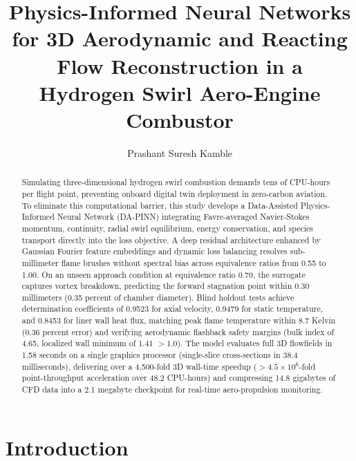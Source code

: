 \documentclass[reprint,aps,prfluids,superscriptaddress,twocolumn,floatfix]{revtex4-2}
\begin{document}
\title{Physics-Informed Neural Networks for 3D Aerodynamic and Reacting Flow Reconstruction in a Hydrogen Swirl Aero-Engine Combustor}

\author{Prashant Suresh Kamble}

\begin{abstract}
Simulating three-dimensional hydrogen swirl combustion demands tens of CPU-hours per flight point, preventing onboard digital twin deployment in zero-carbon aviation. To eliminate this computational barrier, this study develops a Data-Assisted Physics-Informed Neural Network (DA-PINN) integrating Favre-averaged Navier-Stokes momentum, continuity, radial swirl equilibrium, energy conservation, and species transport directly into the loss objective. A deep residual architecture enhanced by Gaussian Fourier feature embeddings and dynamic loss balancing resolves sub-millimeter flame brushes without spectral bias across equivalence ratios from 0.55 to 1.00. On an unseen approach condition at equivalence ratio 0.70, the surrogate captures vortex breakdown, predicting the forward stagnation point within 0.30 millimeters (0.35 percent of chamber diameter). Blind holdout tests achieve determination coefficients of 0.9523 for axial velocity, 0.9479 for static temperature, and 0.8453 for liner wall heat flux, matching peak flame temperature within 8.7 Kelvin (0.36 percent error) and verifying aerodynamic flashback safety margins (bulk index of 4.65, localized wall minimum of 1.41 $> 1.0$). The model evaluates full 3D flowfields in 1.58 seconds on a single graphics processor (single-slice cross-sections in 38.4 milliseconds), delivering over a 4,500-fold 3D wall-time speedup ($> 4.5 \times 10^6$-fold point-throughput acceleration over 48.2 CPU-hours) and compressing 14.8 gigabytes of CFD data into a 2.1 megabyte checkpoint for real-time aero-propulsion monitoring.
\end{abstract}

\maketitle

\section{Introduction}
\label{sec:introduction}
\end{document}
